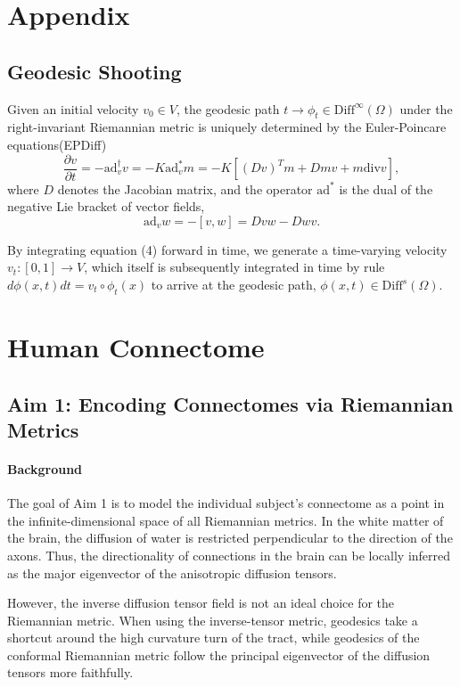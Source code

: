 \documentclass{article}
\theoremstyle{definition}
\theoremstyle{plain}
\begin{document}
\section{Appendix}
\subsection{Geodesic Shooting}
Given an initial velocity $v_0\in V$, the geodesic path $t\rightarrow\phi_t\in\mathrm{Diff}^\infty(\Omega)$ under the right-invariant Riemannian metric is uniquely determined by the Euler-Poincare equations(EPDiff)
\begin{equation}
    \frac{\partial v}{\partial t}=-\mathrm{ad}^\dagger_v v=-K\mathrm{ad}^*_vm=-K[(Dv)^Tm+Dmv+m\mathrm{ div } v],
\end{equation}
where $D$ denotes the Jacobian matrix, and the operator $\mathrm{ad}^*$ is the dual of the negative Lie bracket of vector fields,
\begin{equation*}
    \mathrm{ad}_vw=-[v,w]=Dvw-Dwv.
\end{equation*}

By integrating equation (4) forward in time, we generate a time-varying velocity $v_t:[0,1]\rightarrow V$, which itself is subsequently integrated in time by rule $d\phi(x,t)dt=v_t\circ\phi_t(x)$ to arrive at the geodesic path, $\phi(x,t)\in\mathrm{Diff}^s(\Omega)$.

\newpage
\section{Human Connectome}
\subsection{Aim 1: Encoding Connectomes via Riemannian Metrics}
\paragraph{Background}The goal of Aim 1 is to model the individual subject's connectome as a point in the infinite-dimensional space of all Riemannian metrics. In the white matter of the brain, the diffusion of water is restricted perpendicular to the direction of the axons. Thus, the directionality of connections in the brain can be locally inferred as the major eigenvector of the anisotropic diffusion tensors.

However, the inverse diffusion tensor field is not an ideal choice for the Riemannian metric. When using the inverse-tensor metric, geodesics take a shortcut around the high curvature turn of the tract, while geodesics of the conformal Riemannian metric follow the principal eigenvector of the diffusion tensors more faithfully. 
\end{document}
